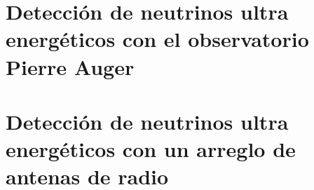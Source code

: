 \documentclass[a4paper,11pt]{book}
\begin{document}
\frontmatter

\renewcommand{\listtablename}{Índice de tablas}
\renewcommand{\tablename}{Tabla} 




\newpage
\thispagestyle{empty}
\mbox{}


% 
\tableofcontents




\mainmatter

\part{Detecci\'on de neutrinos ultra energ\'eticos con el observatorio Pierre Auger}





\part{Detecci\'on de neutrinos ultra energ\'eticos con un arreglo de antenas de radio}






\begin{appendices}






\end{appendices}

\end{document}
